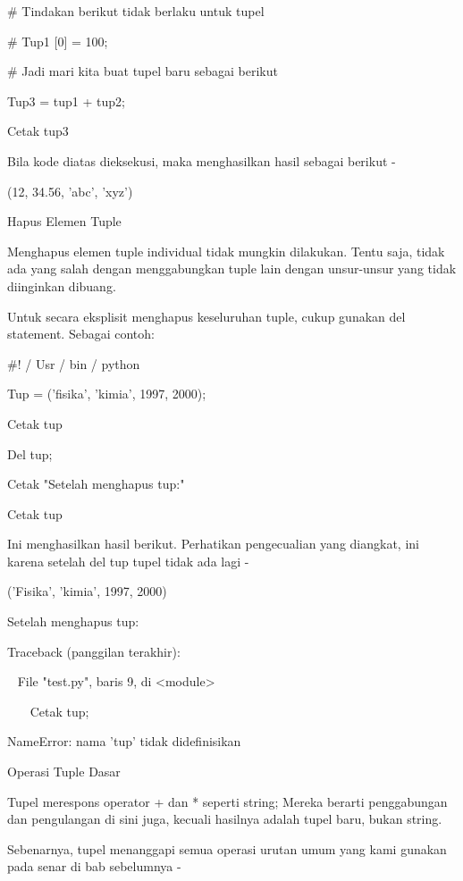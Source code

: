 \vspace{12pt}
 $  \#  $ Tindakan berikut tidak berlaku untuk tupel \par
 $  \#  $ Tup1 [0] = 100; \par
\vspace{12pt}
 $  \#  $ Jadi mari kita buat tupel baru sebagai berikut \par
Tup3 = tup1 + tup2; \par
Cetak tup3 \par
Bila kode diatas dieksekusi, maka menghasilkan hasil sebagai berikut - \par
(12, 34.56, 'abc', 'xyz') \par
Hapus Elemen Tuple \par
Menghapus elemen tuple individual tidak mungkin dilakukan. Tentu saja, tidak ada yang salah dengan menggabungkan tuple lain dengan unsur-unsur yang tidak diinginkan dibuang. \par
Untuk secara eksplisit menghapus keseluruhan tuple, cukup gunakan del statement. Sebagai contoh: \par
 $  \#  $! / Usr / bin / python \par
\vspace{12pt}
Tup = ('fisika', 'kimia', 1997, 2000); \par
\vspace{12pt}
Cetak tup \par
Del tup; \par
Cetak "Setelah menghapus tup:" \par
Cetak tup \par
Ini menghasilkan hasil berikut. Perhatikan pengecualian yang diangkat, ini karena setelah del tup tupel tidak ada lagi - \par
('Fisika', 'kimia', 1997, 2000) \par
Setelah menghapus tup: \par
Traceback (panggilan terakhir): \par
~ File "test.py", baris 9, di <module> \par
~~~ Cetak tup; \par
NameError: nama 'tup' tidak didefinisikan \par
Operasi Tuple Dasar \par
Tupel merespons operator + dan * seperti string; Mereka berarti penggabungan dan pengulangan di sini juga, kecuali hasilnya adalah tupel baru, bukan string. \par
Sebenarnya, tupel menanggapi semua operasi urutan umum yang kami gunakan pada senar di bab sebelumnya - \par
